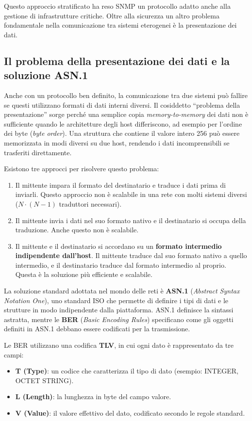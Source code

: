 Questo approccio stratificato ha reso SNMP un protocollo adatto anche alla 
gestione di infrastrutture critiche. 
Oltre alla sicurezza un altro problema fondamentale nella comunicazione tra 
sistemi eterogenei è la presentazione dei dati.

\subsection{Il problema della presentazione dei dati e la soluzione ASN.1}

Anche con un protocollo ben definito, la comunicazione tra due sistemi può
fallire se questi utilizzano formati di dati interni diversi. Il cosiddetto
``problema della presentazione'' sorge perché una semplice copia
\textit{memory-to-memory} dei dati non è sufficiente quando le architetture
degli host differiscono, ad esempio per l'ordine dei byte (\textit{byte order}).
Una struttura che contiene il valore intero 256 può essere memorizzata in modi
diversi su due host, rendendo i dati incomprensibili se trasferiti direttamente.

Esistono tre approcci per risolvere questo problema:
\begin{enumerate}
\item Il mittente impara il formato del destinatario e traduce i dati prima di
inviarli. Questo approccio non è scalabile in una rete con molti sistemi
diversi (\(N \cdot (N-1)\) traduttori necessari).
\item Il mittente invia i dati nel suo formato nativo e il destinatario si
occupa della traduzione. Anche questo non è scalabile.
\item Il mittente e il destinatario si accordano su un \textbf{formato
intermedio indipendente dall'host}. Il mittente traduce dal suo formato nativo
a quello intermedio, e il destinatario traduce dal formato intermedio al
proprio. Questa è la soluzione più efficiente e scalabile.
\end{enumerate}

La soluzione standard adottata nel mondo delle reti è \textbf{ASN.1}
(\textit{Abstract Syntax Notation One}), uno standard ISO che permette
di definire i tipi di dati e le strutture in modo indipendente dalla piattaforma.
ASN.1 definisce la sintassi astratta, mentre le \textbf{BER}
(\textit{Basic Encoding Rules}) specificano come gli oggetti definiti in ASN.1
debbano essere codificati per la trasmissione.

Le BER utilizzano una codifica \textbf{TLV}, in cui ogni dato è rappresentato 
da tre campi:
\begin{itemize}
\item \textbf{T (Type)}: un codice che caratterizza il tipo di dato
(esempio: INTEGER, OCTET STRING).
\item \textbf{L (Length)}: la lunghezza in byte del campo valore.
\item \textbf{V (Value)}: il valore effettivo del dato, codificato secondo le
regole standard.
\end{itemize}

